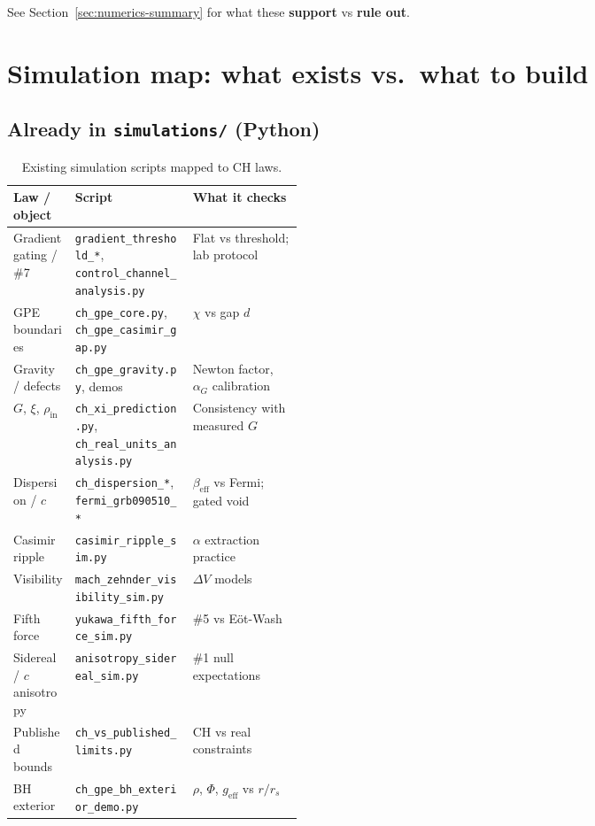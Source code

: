 \documentclass[11pt,a4paper]{article}
\begin{document}
See Section~\ref{sec:numerics-summary} for what these \textbf{support} vs \textbf{rule out}.

\section{Simulation map: what exists vs.\ what to build}
\label{sec:sim}

\subsection{Already in \texttt{simulations/} (Python)}
\label{sec:sim-existing}

\begin{table}[htbp]
  \centering
  \footnotesize
  \caption{Existing simulation scripts mapped to CH laws.}
  \begin{tabular}{@{}llp{0.38\linewidth}@{}}
    \toprule
    Law / object & Script & What it checks \\
    \midrule
    Gradient gating / \#7 & \texttt{gradient\_threshold\_*}, \texttt{control\_channel\_analysis.py} & Flat vs threshold; lab protocol \\
    GPE boundaries & \texttt{ch\_gpe\_core.py}, \texttt{ch\_gpe\_casimir\_gap.py} & $\chi$ vs gap $d$ \\
    Gravity / defects & \texttt{ch\_gpe\_gravity.py}, demos & Newton factor, $\alpha_G$ calibration \\
    $G$, $\xi$, $\rho_{\mathrm{in}}$ & \texttt{ch\_xi\_prediction.py}, \texttt{ch\_real\_units\_analysis.py} & Consistency with measured $G$ \\
    Dispersion / $c$ & \texttt{ch\_dispersion\_*}, \texttt{fermi\_grb090510\_*} & $\beta_{\mathrm{eff}}$ vs Fermi; gated void \\
    Casimir ripple & \texttt{casimir\_ripple\_sim.py} & $\alpha$ extraction practice \\
    Visibility & \texttt{mach\_zehnder\_visibility\_sim.py} & $\Delta V$ models \\
    Fifth force & \texttt{yukawa\_fifth\_force\_sim.py} & \#5 vs E\"ot-Wash \\
    Sidereal / $c$ anisotropy & \texttt{anisotropy\_sidereal\_sim.py} & \#1 null expectations \\
    Published bounds & \texttt{ch\_vs\_published\_limits.py} & CH vs real constraints \\
    BH exterior & \texttt{ch\_gpe\_bh\_exterior\_demo.py} & $\rho$, $\Phi$, $g_{\mathrm{eff}}$ vs $r/r_s$ \\

\end{tabular}
\end{table}
\end{document}

